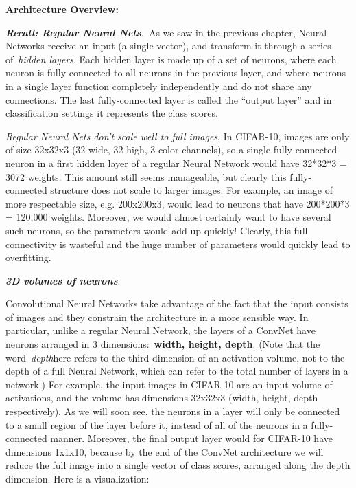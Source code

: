 \documentclass{article} %
\begin{document}
\noindent \textbf{Architecture Overview:}

\noindent \textbf{\textit{Recall: Regular Neural Nets}}\textit{.}~As we saw in the previous chapter, Neural Networks receive an input (a single vector), and transform it through a series of~\textit{hidden layers}. Each hidden layer is made up of a set of neurons, where each neuron is fully connected to all neurons in the previous layer, and where neurons in a single layer function completely independently and do not share any connections. The last fully-connected layer is called the ``output layer'' and in classification settings it represents the class scores.

\noindent \textit{Regular Neural Nets don't scale well to full images}. In CIFAR-10, images are only of size 32x32x3 (32 wide, 32 high, 3 color channels), so a single fully-connected neuron in a first hidden layer of a regular Neural Network would have 32*32*3 = 3072 weights. This amount still seems manageable, but clearly this fully-connected structure does not scale to larger images. For example, an image of more respectable size, e.g. 200x200x3, would lead to neurons that have 200*200*3 = 120,000 weights. Moreover, we would almost certainly want to have several such neurons, so the parameters would add up quickly! Clearly, this full connectivity is wasteful and the huge number of parameters would quickly lead to overfitting.

\noindent \textbf{\textit{3D volumes of neurons}}. 

\noindent Convolutional Neural Networks take advantage of the fact that the input consists of images and they constrain the architecture in a more sensible way. In particular, unlike a regular Neural Network, the layers of a ConvNet have neurons arranged in 3 dimensions:~\textbf{width, height, depth}. (Note that the word~\textit{depth}here refers to the third dimension of an activation volume, not to the depth of a full Neural Network, which can refer to the total number of layers in a network.) For example, the input images in CIFAR-10 are an input volume of activations, and the volume has dimensions 32x32x3 (width, height, depth respectively). As we will soon see, the neurons in a layer will only be connected to a small region of the layer before it, instead of all of the neurons in a fully-connected manner. Moreover, the final output layer would for CIFAR-10 have dimensions 1x1x10, because by the end of the ConvNet architecture we will reduce the full image into a single vector of class scores, arranged along the depth dimension. Here is a visualization:
\end{document}

